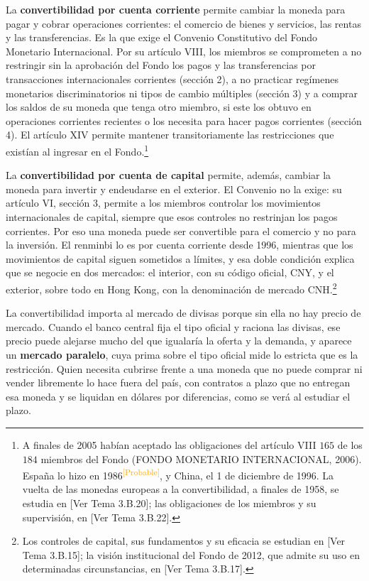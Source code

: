 \documentclass[10pt,a4paper]{article}
\newcommand{\authorfont}[1]{{\fontfamily{EBGaramond-TLF}\selectfont #1}}
\begin{document}
La \textbf{convertibilidad por cuenta corriente} permite cambiar la moneda para pagar y cobrar operaciones corrientes: el comercio de bienes y servicios, las rentas y las transferencias. Es la que exige el Convenio Constitutivo del Fondo Monetario Internacional. Por su artículo VIII, los miembros se comprometen a no restringir sin la aprobación del Fondo los pagos y las transferencias por transacciones internacionales corrientes (sección 2), a no practicar regímenes monetarios discriminatorios ni tipos de cambio múltiples (sección 3) y a comprar los saldos de su moneda que tenga otro miembro, si este los obtuvo en operaciones corrientes recientes o los necesita para hacer pagos corrientes (sección 4). El artículo XIV permite mantener transitoriamente las restricciones que existían al ingresar en el Fondo.\footnote{%
    A finales de 2005 habían aceptado las obligaciones del artículo VIII $165$ de los $184$ miembros del Fondo (FONDO MONETARIO INTERNACIONAL, 2006). España lo hizo en 1986\textcolor{orange}{\textsuperscript{[Probable]}}, y China, el 1 de diciembre de 1996. La vuelta de las monedas europeas a la convertibilidad, a finales de 1958, se estudia en [\authorfont{Ver Tema 3.B.20}]; las obligaciones de los miembros y su supervisión, en [\authorfont{Ver Tema 3.B.22}].
}

La \textbf{convertibilidad por cuenta de capital} permite, además, cambiar la moneda para invertir y endeudarse en el exterior. El Convenio no la exige: su artículo VI, sección 3, permite a los miembros controlar los movimientos internacionales de capital, siempre que esos controles no restrinjan los pagos corrientes. Por eso una moneda puede ser convertible para el comercio y no para la inversión. El renminbi lo es por cuenta corriente desde 1996, mientras que los movimientos de capital siguen sometidos a límites, y esa doble condición explica que se negocie en dos mercados: el interior, con su código oficial, CNY, y el exterior, sobre todo en Hong Kong, con la denominación de mercado CNH.\footnote{%
    Los controles de capital, sus fundamentos y su eficacia se estudian en [\authorfont{Ver Tema 3.B.15}]; la visión institucional del Fondo de 2012, que admite su uso en determinadas circunstancias, en [\authorfont{Ver Tema 3.B.17}].
}

La convertibilidad importa al mercado de divisas porque sin ella no hay precio de mercado. Cuando el banco central fija el tipo oficial y raciona las divisas, ese precio puede alejarse mucho del que igualaría la oferta y la demanda, y aparece un \textbf{mercado paralelo}, cuya prima sobre el tipo oficial mide lo estricta que es la restricción. Quien necesita cubrirse frente a una moneda que no puede comprar ni vender libremente lo hace fuera del país, con contratos a plazo que no entregan esa moneda y se liquidan en dólares por diferencias, como se verá al estudiar el plazo.
\end{document}
